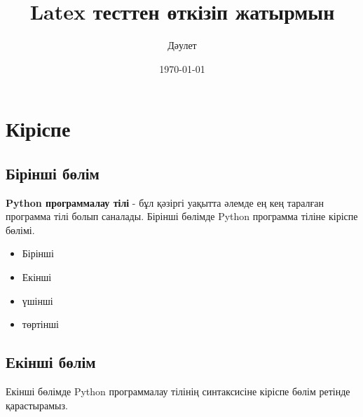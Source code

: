 \documentclass[14pt, a4paper]{book}
\author{Дәулет}
\title{Latex тесттен өткізіп жатырмын}
\date{\today}
\begin{document}
    \maketitle

    \tableofcontents{}
    \clearpage

    \chapter{Кіріспе}
    \section{Бірінші бөлім}
    \textbf{Python программалау тілі} - бұл қәзіргі уақытта әлемде ең кең 
    таралған программа тілі болып саналады. Бірінші бөлімде Python 
    программа тіліне кіріспе бөлімі.

    \begin{itemize}
        \item Бірінші
        \item Екінші
        \item үшінші
        \item төртінші
    \end{itemize}
    \section{Екінші бөлім}
    Екінші бөлімде Python программалау тілінің синтаксисіне кіріспе
    бөлім ретінде қарастырамыз.
\end{document}
